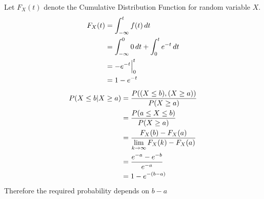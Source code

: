 

Let $F_X(t)$ denote the Cumulative Distribution Function for random variable $X$.\\
\begin{align}
F_X(t) &= \int_{-\infty}^{t} f(t) \,dt
\\[\parskip]
&= \int_{-\infty}^{0} 0 \,dt + \int_{0}^{t} e^{-t} \,dt
\\[\parskip]
&= -e^{-t}\Big|_{0}^t
\\[\parskip]
&= 1-e^{-t}
\end{align}
\begin{align}
P(X\leq b|X\geq a) &= \dfrac{P((X\leq b),(X\geq a))}{P(X\geq a)}
\\[\parskip]
&= \dfrac{P(a\leq X \leq b)}{P(X\geq a)}
\\[\parskip]
&=\dfrac{F_X(b)-F_X(a)}{\displaystyle\lim_{k\to\infty} F_X(k)-F_X(a)}
\\[\parskip]
&=\dfrac{e^{-a}-e^{-b}}{e^{-a}}
\\[\parskip]
&=1-e^{-(b-a)}
\end{align}
Therefore the required probability depends on $b-a$\\

